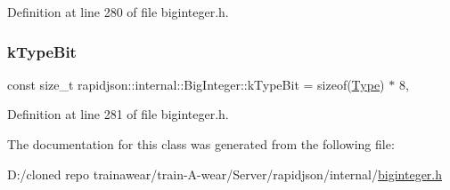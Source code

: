 Definition at line 280 of file biginteger.\+h.

\mbox{\label{classrapidjson_1_1internal_1_1_big_integer_a947ac91b3471b15a442e9c90db566658}} 
\subsubsection{\texorpdfstring{kTypeBit}{kTypeBit}}
{\footnotesize\ttfamily const size\+\_\+t rapidjson\+::internal\+::\+Big\+Integer\+::k\+Type\+Bit = sizeof(\mbox{\hyperlink{classrapidjson_1_1internal_1_1_big_integer_a37d8e8c111f0d76fa07bb4da4790514d}{Type}}) $\ast$ 8\hspace{0.3cm}{\ttfamily [static]}, {\ttfamily [private]}}



Definition at line 281 of file biginteger.\+h.



The documentation for this class was generated from the following file\+:\begin{DoxyCompactItemize}
\item 
D\+:/cloned repo trainawear/train-\/\+A-\/wear/\+Server/rapidjson/internal/\mbox{\hyperlink{biginteger_8h}{biginteger.\+h}}\end{DoxyCompactItemize}
